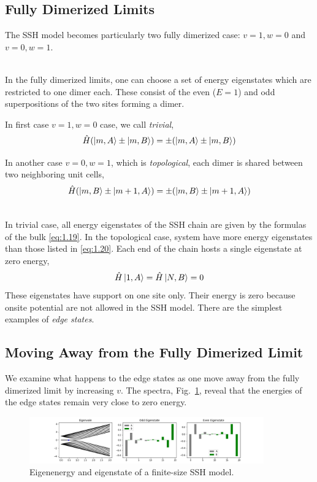 \subsection{Fully Dimerized Limits} \label{sec:1.3.1}
The SSH model becomes particularly two fully dimerized case: $v=1, w=0$ and $v=0, w=1$.

\\
In the fully dimerized limits, one can choose a set of energy eigenstates which are restricted to one dimer each.
These consist of the even ($E=1$) and odd superpositions of the two sites forming a dimer.

In first case $v=1, w=0$ case, we call \textit{trivial},
\begin{equation}
    \hat{H} (\ket{m,A} \pm \ket{m,B}) = \pm( \ket{m,A} \pm \ket{m,B})
    \label{eq:1.19}
\end{equation}

In another case $v=0, w=1$, which is \textit{topological}, each dimer is shared between two neighboring unit cells,
\begin{equation}
    \hat{H} (\ket{m,B} \pm \ket{m+1,A}) = \pm( \ket{m,B} \pm \ket{m+1,A})
    \label{eq:1.20}
\end{equation}

\\
In trivial case, all energy eigenstates of the SSH chain are given by the formulas of the bulk \eqref{eq:1.19}.
In the topological case, system have more energy eigenstates than those listed in \eqref{eq:1.20}.
Each end of the chain hosts a single eigenstate at zero energy,
\begin{equation}
    \hat{H} \ket{1,A} = \hat{H} \ket{N,B} = 0
    \label{eq:1.21}
\end{equation}
These eigenstates have support on one site only.
Their energy is zero because onsite potential are not allowed in the SSH model.
There are the simplest examples of \textit{edge states}.

\subsection{Moving Away from the Fully Dimerized Limit}\label{sec:1.3.2}
We examine what happens to the edge states as one move away from the fully dimerized limit by increasing $v$.
The spectra, Fig.~\ref{fig:1.4}, reveal that the energies of the edge states remain very close to zero energy.
\begin{figure}
    \center
    \includegraphics[width=0.9\textwidth]{./fig/fig1-4.png}
    \caption{Eigenenergy and eigenstate of a finite-size SSH model.}
    \label{fig:1.4}
\end{figure}

